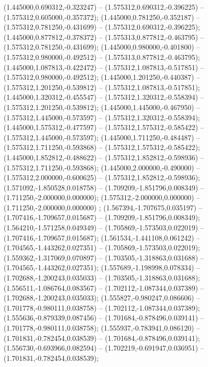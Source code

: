  (1.445000,0.690312,-0.323247) -- (1.575312,0.690312,-0.396225) -- (1.575312,0.605000,-0.357372);
 (1.445000,0.781250,-0.352187) -- (1.575312,0.781250,-0.431699) -- (1.575312,0.690312,-0.396225);
 (1.445000,0.877812,-0.378372) -- (1.575313,0.877812,-0.463795) -- (1.575312,0.781250,-0.431699);
 (1.445000,0.980000,-0.401800) -- (1.575312,0.980000,-0.492512) -- (1.575313,0.877812,-0.463795);
 (1.445000,1.087813,-0.422472) -- (1.575312,1.087813,-0.517851) -- (1.575312,0.980000,-0.492512);
 (1.445000,1.201250,-0.440387) -- (1.575312,1.201250,-0.539812) -- (1.575312,1.087813,-0.517851);
 (1.445000,1.320312,-0.455547) -- (1.575312,1.320312,-0.558394) -- (1.575312,1.201250,-0.539812);
 (1.445000,1.445000,-0.467950) -- (1.575312,1.445000,-0.573597) -- (1.575312,1.320312,-0.558394);
 (1.445000,1.575312,-0.477597) -- (1.575312,1.575312,-0.585422) -- (1.575312,1.445000,-0.573597);
 (1.445000,1.711250,-0.484487) -- (1.575312,1.711250,-0.593868) -- (1.575312,1.575312,-0.585422);
 (1.445000,1.852812,-0.488622) -- (1.575312,1.852812,-0.598936) -- (1.575312,1.711250,-0.593868);
 (1.445000,2.000000,-0.490000) -- (1.575312,2.000000,-0.600625) -- (1.575312,1.852812,-0.598936);
 (1.571092,-1.850528,0.018758) -- (1.709209,-1.851796,0.008349) -- (1.711250,-2.000000,0.000000);
 (1.575312,-2.000000,0.000000) -- (1.711250,-2.000000,0.000000) ;
 (1.567394,-1.707675,0.035197) -- (1.707416,-1.709657,0.015687) -- (1.709209,-1.851796,0.008349);
 (1.564210,-1.571258,0.049349) -- (1.705869,-1.573503,0.022019) -- (1.707416,-1.709657,0.015687);
 (1.561534,-1.441108,0.061242) -- (1.704565,-1.443262,0.027351) -- (1.705869,-1.573503,0.022019);
 (1.559362,-1.317069,0.070897) -- (1.703505,-1.318863,0.031688) -- (1.704565,-1.443262,0.027351);
 (1.557689,-1.198998,0.078334) -- (1.702688,-1.200243,0.035033) -- (1.703505,-1.318863,0.031688);
 (1.556511,-1.086764,0.083567) -- (1.702112,-1.087344,0.037389) -- (1.702688,-1.200243,0.035033);
 (1.555827,-0.980247,0.086606) -- (1.701778,-0.980111,0.038758) -- (1.702112,-1.087344,0.037389);
 (1.555636,-0.879339,0.087456) -- (1.701684,-0.878496,0.039141) -- (1.701778,-0.980111,0.038758);
 (1.555937,-0.783941,0.086120) -- (1.701831,-0.782454,0.038539) -- (1.701684,-0.878496,0.039141);
 (1.556730,-0.693966,0.082594) -- (1.702219,-0.691947,0.036951) -- (1.701831,-0.782454,0.038539);
